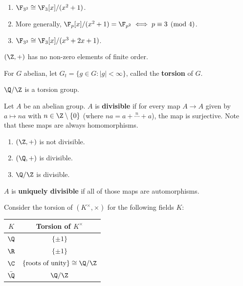 \begin{ex}
    \begin{enumerate}
        \item $\F_{3^2} \cong \F_3[x]/(x^2+1)$.
        \item More generally, $\F_p[x]/(x^2+1) = \F_{p^2} \iff p \equiv 3 \pmod 4$.
        \item $\F_{3^3} \cong \F_3[x]/(x^3+2x+1)$.
    \end{enumerate}
\end{ex}

\begin{notebox*}[Recall]
    $(\Z,+)$ has no non-zero elements of finite order.
\end{notebox*}

\begin{defn}
    For $G$ abelian, let $G_t = \{g \in G : |g| < \infty\}$, called the \textbf{torsion} of $G$.
\end{defn}

\begin{ex}
    $\Q/\Z$ is a torsion group.
\end{ex}

\begin{defn}
    Let $A$ be an abelian group. $A$ is \textbf{divisible} if for every map $A \to A$ given by $a \mapsto na$ with $n \in \Z \setminus \{0\}$ (where $na = a + \overset{n}{\cdots} + a$), the map is surjective. Note that these maps are always homomorphisms.
\end{defn}

\begin{ex}
    \begin{enumerate}
        \item $(\Z,+)$ is not divisible.
        \item $(\Q,+)$ is divisible.
        \item $\Q/\Z$ is divisible.
    \end{enumerate}
\end{ex}

\begin{defn}
    $A$ is \textbf{uniquely divisible} if all of those maps are automorphisms.
\end{defn}

\begin{ex}
    Consider the torsion of $(K^\times, \times)$ for the following fields $K$:
    \begin{center}
        \begin{tabular}{c|c}
            $K$ & Torsion of $K^\times$ \\ \hline
            $\Q$ & $\{\pm 1\}$ \\
            $\R$ & $\{\pm 1\}$ \\
            $\C$ & $\{\text{roots of unity}\} \cong \Q/\Z$ \\
            $\bar \Q$ & $\Q/\Z$
        \end{tabular}
    \end{center}
\end{ex}

